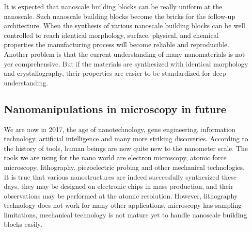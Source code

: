It is expected that nanoscale building blocks can be really uniform at the nanoscale. Such nanoscale building blocks become the bricks for the follow-up architecture. When the synthesis of various nanoscale building blocks can be well controlled to reach identical morphology, surface, physical, and chemical properties the manufacturing process will become reliable and reproducible. 
Another problem is that the current understanding of many nanomaterials is not yer comprehensive. But if the materials are synthesized with identical morphology and crystallography, their properties are easier to be standardized for deep understanding. 

\subsection{Nanomanipulations in microscopy in future}
We are now in 2017, the age of nanotechnology, gene engineering, information technology, artificial intelligence and many more striking discoveries. According to the history of tools, human beings are now quite new to the nanometer scale. The tools we are using for the nano world are electron microscopy, atomic force microscopy, lithography, piezoelectric probing and other mechanical technologies. It is true that various nanostructures are indeed successfully synthesized these days, they may be designed on electronic chips in mass production, and their observations may be performed at the atomic resolution. However, lithography technology does not work for many other applications, microscopy has sampling limitations, mechanical technology is not mature yet to handle nanoscale building blocks easily. 

